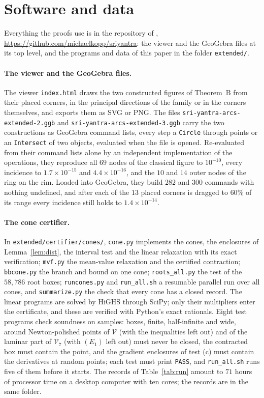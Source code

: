 \documentclass[11pt,a4paper]{article}
\theoremstyle{definition}
\theoremstyle{remark}
\newcommand{\V}{\mathcal{V}}
\begin{document}
\section{Software and data}\label{sec:software}
\begin{sloppypar}
Everything the proofs use is in the repository of \cite{CK}, \url{https://github.com/michaelkopp/sriyantra}:
the viewer and the GeoGebra files at its top level, and the programs and data of this paper in the folder
\texttt{extended/}.

\paragraph{The viewer and the GeoGebra files.} The viewer \texttt{index.html} draws the two constructed
figures of Theorem~B from their placed corners, in the principal directions of the family or in the
corners themselves, and exports them as SVG or PNG. The files \texttt{sri-yantra-arcs-extended-2.ggb} and
\texttt{sri-yantra-arcs-extended-3.ggb} carry the two constructions as GeoGebra command lists, every step a
\texttt{Circle} through points or an \texttt{Intersect} of two objects, evaluated when the file is opened.
Re-evaluated from their command lists alone by an independent implementation of the operations, they
reproduce all $69$ nodes of the classical figure to $10^{-10}$, every incidence to $1.7\times10^{-15}$ and
$4.4\times10^{-16}$, and the $10$ and $14$ outer nodes of the ring on the rim. Loaded into GeoGebra, they
build $282$ and $300$ commands with nothing undefined, and after each of the $13$ placed corners is dragged
to $60\%$ of its range every incidence still holds to $1.4\times10^{-14}$.

\paragraph{The cone certifier.} In \texttt{extended/certifier/cones/}, \texttt{cone.py} implements the cones, the enclosures of
Lemma~\ref{lem:dist}, the interval test and the linear relaxation with its exact verification;
\texttt{mvf.py} the mean-value relaxation and the certified contraction; \texttt{bbcone.py} the branch
and bound on one cone; \texttt{roots\_all.py} the test of the $58{,}786$ root boxes; \texttt{runcones.py}
and \texttt{run\_all.sh} a resumable parallel run over all cones, and \texttt{summarize.py} the check that
every cone has a closed record. The linear programs are solved by HiGHS \cite{HiGHS} through SciPy; only
their multipliers enter the certificate, and these are verified with Python's exact rationals. Eight test
programs check soundness on samples: boxes, finite, half-infinite and wide, around Newton-polished points
of $\V$ (with the inequalities left out) and of the laminar part of $\V_7$ (with $(E_1)$ left out) must
never be closed, the contracted box must contain the point, and the gradient enclosures of test (c) must
contain the derivatives at random points; each test must print \texttt{PASS}, and \texttt{run\_all.sh}
runs five of them before it starts. The records of Table~\ref{tab:run} amount to $71$ hours of processor time on a
desktop computer with ten cores; the records are in the same folder.


\end{sloppypar}
\end{document}
